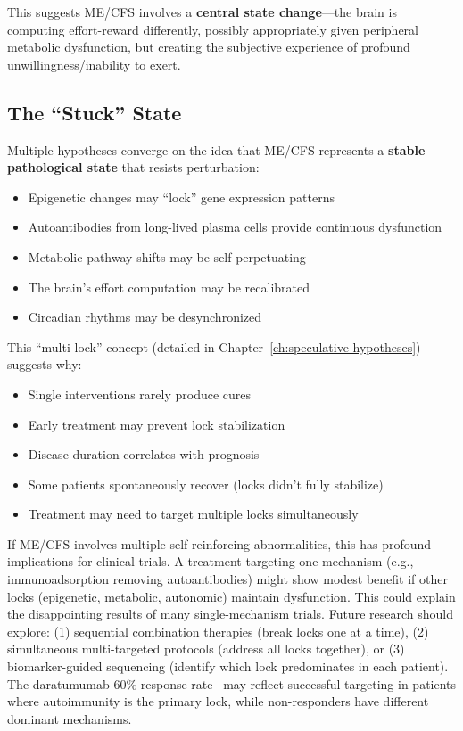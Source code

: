 This suggests ME/CFS involves a \textbf{central state change}---the brain is computing effort-reward differently, possibly appropriately given peripheral metabolic dysfunction, but creating the subjective experience of profound unwillingness/inability to exert.

\subsection{The ``Stuck'' State}

Multiple hypotheses converge on the idea that ME/CFS represents a \textbf{stable pathological state} that resists perturbation:

\begin{itemize}
    \item Epigenetic changes may ``lock'' gene expression patterns
    \item Autoantibodies from long-lived plasma cells provide continuous dysfunction
    \item Metabolic pathway shifts may be self-perpetuating
    \item The brain's effort computation may be recalibrated
    \item Circadian rhythms may be desynchronized
\end{itemize}

This ``multi-lock'' concept (detailed in Chapter~\ref{ch:speculative-hypotheses}) suggests why:
\begin{itemize}
    \item Single interventions rarely produce cures
    \item Early treatment may prevent lock stabilization
    \item Disease duration correlates with prognosis
    \item Some patients spontaneously recover (locks didn't fully stabilize)
    \item Treatment may need to target multiple locks simultaneously
\end{itemize}

\begin{observation}
\label{obs:multi-lock-treatment}
If ME/CFS involves multiple self-reinforcing abnormalities, this has profound implications for clinical trials. A treatment targeting one mechanism (e.g., immunoadsorption removing autoantibodies) might show modest benefit if other locks (epigenetic, metabolic, autonomic) maintain dysfunction. This could explain the disappointing results of many single-mechanism trials. Future research should explore: (1) sequential combination therapies (break locks one at a time), (2) simultaneous multi-targeted protocols (address all locks together), or (3) biomarker-guided sequencing (identify which lock predominates in each patient). The daratumumab 60\% response rate~\cite{Fluge2025daratumumab} may reflect successful targeting in patients where autoimmunity is the primary lock, while non-responders have different dominant mechanisms.
\end{observation}


